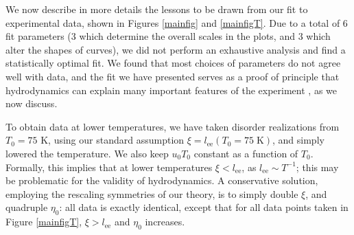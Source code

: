 \documentclass[10pt, oneside]{book}
\begin{document}
\begin{doublespace}
We now describe in more details the lessons to be drawn from our fit to experimental data, shown in Figures \ref{mainfig} and \ref{mainfigT}.   Due to a total of 6 fit parameters (3 which determine the overall scales in the plots, and 3 which alter the shapes of curves),  we did not perform an exhaustive analysis and find a statistically optimal fit.   We found that most choices of parameters do not agree well with data, and the fit we have presented serves as a proof of principle that hydrodynamics can explain many important features of the experiment \cite{Crossno1058}, as we now discuss.


 To obtain data at lower temperatures, we have taken disorder realizations from $T_0=75$ K, using our standard assumption $\xi=l_{\mathrm{ee}}(T_0=75\; \mathrm{K})$, and simply lowered the temperature.  We also keep $u_0T_0$ constant as a function of $T_0$.  Formally, this implies that at lower temperatures $\xi<l_{\mathrm{ee}}$, as $l_{\mathrm{ee}}\sim T^{-1}$;  this may be problematic for the validity of hydrodynamics.    A conservative solution, employing the rescaling symmetries of our theory, is to simply double $\xi$,  and quadruple $\eta_0$:  all data is exactly identical, except that for all data points taken in Figure \ref{mainfigT},  $\xi>l_{\mathrm{ee}}$ and $\eta_0$ increases.


\end{doublespace}
\end{document}
